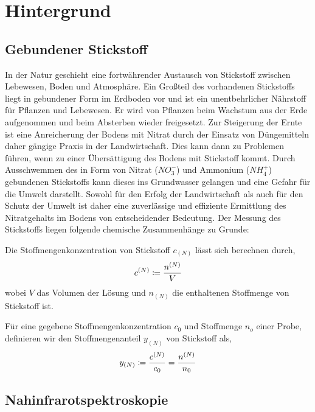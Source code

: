 \section{Hintergrund}
\label{sec:Hintergrund}
	
	\subsection{Gebundener Stickstoff}
	\label{ssec:Gebundener Stickstoff}
	
	In der Natur geschieht eine fortwährender Austausch von Stickstoff zwischen Lebewesen, Boden und Atmosphäre. 
	Ein Großteil des vorhandenen Stickstoffs liegt in gebundener Form im Erdboden vor und ist ein unentbehrlicher Nährstoff für Pflanzen und Lebewesen.
	Er wird von Pflanzen beim Wachstum aus der Erde aufgenommen und beim Absterben wieder freigesetzt.
    Zur Steigerung der Ernte ist eine Anreicherung der Bodens mit Nitrat durch der Einsatz von Düngemitteln daher gängige Praxis in der Landwirtschaft.\cite{Umweltbundesamt2017}
    Dies kann dann zu Problemen führen, wenn zu einer Übersättigung des Bodens mit Stickstoff kommt.
    Durch Ausschwemmen des in Form von Nitrat ($NO_3^-$) und Ammonium ($NH_4^+$) gebundenen Stickstoffs kann dieses ins Grundwasser gelangen und eine Gefahr für die Umwelt darstellt.
    Sowohl für den Erfolg der Landwirtschaft als auch für den Schutz der Umwelt ist daher eine zuverlässige und effiziente Ermittlung des Nitratgehalts im Bodens von entscheidender Bedeutung.
    Der Messung des Stickstoffs liegen folgende chemische Zusammenhänge zu Grunde:
    
    
    Die Stoffmengenkonzentration von Stickstoff $c_{(N)}$ lässt sich berechnen durch,
    	\[
			c^{(N)} \coloneqq \frac{n^{(N)}}{V}
		\]
		wobei $V$ das Volumen der Lösung und $n_{(N)}$ die enthaltenen Stoffmenge von Stickstoff ist.
		
    Für eine gegebene Stoffmengenkonzentration $c_0$  und Stoffmenge $n_o$ einer Probe, definieren wir den Stoffmengenanteil $y_{(N)}$ von Stickstoff als,
        \[
			y_{(N)} \coloneqq \frac{c^{(N)}}{c_0} = \frac{n^{(N)}}{n_0}
		\]
   

	\subsection{Nahinfrarotspektroskopie}
	\label{ssec:nirs}
	
